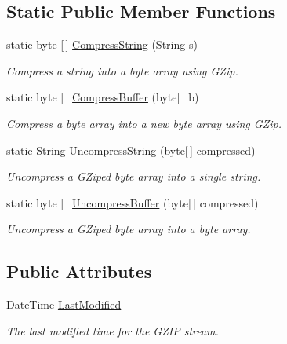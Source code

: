 \subsection*{Static Public Member Functions}
\begin{DoxyCompactItemize}
\item 
static byte \mbox{[}$\,$\mbox{]} \mbox{\hyperlink{class_super_tiled2_unity_1_1_ionic_1_1_zlib_1_1_g_zip_stream_a9fc4f76be82e1858510a322bcbf33d19}{Compress\+String}} (String s)
\begin{DoxyCompactList}\small\item\em Compress a string into a byte array using G\+Zip. \end{DoxyCompactList}\item 
static byte \mbox{[}$\,$\mbox{]} \mbox{\hyperlink{class_super_tiled2_unity_1_1_ionic_1_1_zlib_1_1_g_zip_stream_a8921597b77e25b2725aa74f2af045bd7}{Compress\+Buffer}} (byte\mbox{[}$\,$\mbox{]} b)
\begin{DoxyCompactList}\small\item\em Compress a byte array into a new byte array using G\+Zip. \end{DoxyCompactList}\item 
static String \mbox{\hyperlink{class_super_tiled2_unity_1_1_ionic_1_1_zlib_1_1_g_zip_stream_aa0f08dbda6cd5100d69af35ecbf7baf3}{Uncompress\+String}} (byte\mbox{[}$\,$\mbox{]} compressed)
\begin{DoxyCompactList}\small\item\em Uncompress a G\+Zip\textquotesingle{}ed byte array into a single string. \end{DoxyCompactList}\item 
static byte \mbox{[}$\,$\mbox{]} \mbox{\hyperlink{class_super_tiled2_unity_1_1_ionic_1_1_zlib_1_1_g_zip_stream_afe494e891223e6d1de0d09ea8eeb3566}{Uncompress\+Buffer}} (byte\mbox{[}$\,$\mbox{]} compressed)
\begin{DoxyCompactList}\small\item\em Uncompress a G\+Zip\textquotesingle{}ed byte array into a byte array. \end{DoxyCompactList}\end{DoxyCompactItemize}
\subsection*{Public Attributes}
\begin{DoxyCompactItemize}
\item 
Date\+Time \mbox{\hyperlink{class_super_tiled2_unity_1_1_ionic_1_1_zlib_1_1_g_zip_stream_a2833edcfc2a88f9d036ca748be768188}{Last\+Modified}}
\begin{DoxyCompactList}\small\item\em The last modified time for the G\+Z\+IP stream. \end{DoxyCompactList}\end{DoxyCompactItemize}
